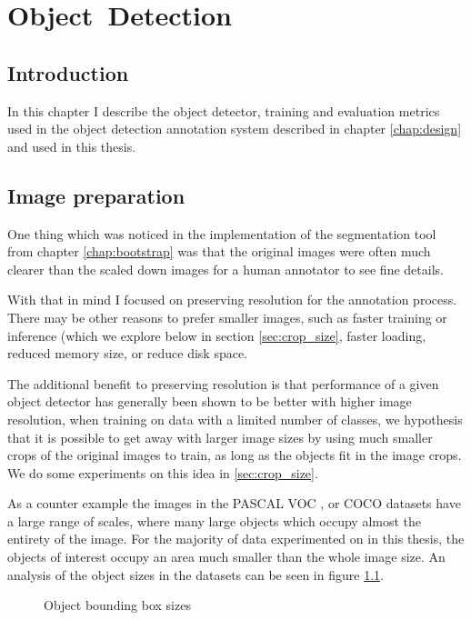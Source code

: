 \chapter{Object~Detection}
\label{chap:object_detection} 

\section{Introduction}

In this chapter I describe the object detector, training and evaluation metrics used in the object detection annotation system described in chapter \ref{chap:design} and used in this thesis.

\section {Image preparation}

One thing which was noticed in the implementation of the segmentation tool from chapter \ref{chap:bootstrap} was that the original images were often much clearer than the scaled down images for a human annotator to see fine details.

With that in mind I focused on preserving resolution for the annotation process. There may be other reasons to prefer smaller images, such as faster training or inference (which we explore below in section \ref{sec:crop_size}, faster loading, reduced memory size, or reduce disk space. 

The additional benefit to preserving resolution is that performance of a given object detector has generally been shown to be better with higher image resolution, when training on data with a limited number of classes, we hypothesis that it is possible to get away with larger image sizes by using much smaller crops of the original images to train, as long as the objects fit in the image crops. We do some experiments on this idea in \ref{sec:crop_size}.

As a counter example the images in the PASCAL VOC \cite{Everingham2008}, or COCO\cite{Lin2014} datasets have a large range of scales, where many large objects which occupy almost the entirety of the image. For the majority of data experimented on in this thesis, the objects of interest occupy an area much smaller than the whole image size. An analysis of the object sizes in the datasets can be seen in figure \ref{fig:box_sizes}.



\begin{figure}[ht]
\centering

\caption{Object bounding box sizes}
\label{fig:box_sizes}
\end{figure}


